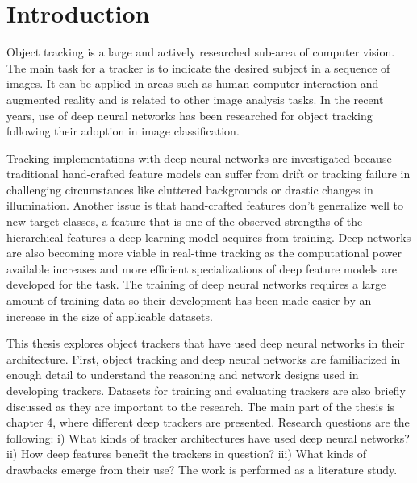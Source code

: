 \section{Introduction}
Object tracking is a large and actively researched sub-area of computer vision. The main task for a tracker is to indicate the desired subject in a sequence of images. It can be applied in areas such as human-computer interaction and augmented reality and is related to other image analysis tasks. In the recent years, use of deep neural networks has been researched for object tracking following their adoption in image classification.

Tracking implementations with deep neural networks are investigated because traditional hand-crafted feature models can suffer from drift or tracking failure in challenging circumstances like cluttered backgrounds or drastic changes in illumination. Another issue is that hand-crafted features don’t generalize well to new target classes, a feature that is one of the observed strengths of the hierarchical features a deep learning model acquires from training. Deep networks are also becoming more viable in real-time tracking as the computational power available increases and more efficient specializations of deep feature models are developed for the task. The training of deep neural networks requires a large amount of training data so their development has been made easier by an increase in the size of applicable datasets.

This thesis explores object trackers that have used deep neural networks in their architecture. First, object tracking and deep neural networks are familiarized in enough detail to understand the reasoning and network designs used in developing trackers. Datasets for training and evaluating trackers are also briefly discussed as they are important to the research. The main part of the thesis is chapter 4, where different deep trackers are presented. Research questions are the following: i) What kinds of tracker architectures have used deep neural networks? ii) How deep features benefit the trackers in question? iii) What kinds of drawbacks emerge from their use? The work is performed as a literature study.
